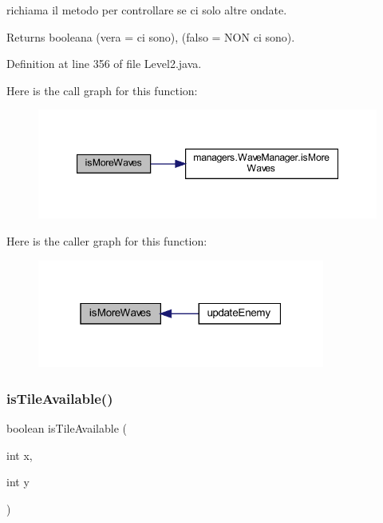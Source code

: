 richiama il metodo per controllare se ci solo altre ondate. 

\begin{DoxyReturn}{Returns}
booleana (vera = ci sono), (falso = N\+ON ci sono). 
\end{DoxyReturn}


Definition at line 356 of file Level2.\+java.

Here is the call graph for this function\+:\nopagebreak
\begin{figure}[H]
\begin{center}
\leavevmode
\includegraphics[width=347pt]{classscenes_1_1_level2_a999f12a033f49f299ad7f55bcae24447_cgraph}
\end{center}
\end{figure}
Here is the caller graph for this function\+:\nopagebreak
\begin{figure}[H]
\begin{center}
\leavevmode
\includegraphics[width=268pt]{classscenes_1_1_level2_a999f12a033f49f299ad7f55bcae24447_icgraph}
\end{center}
\end{figure}
\mbox{\label{classscenes_1_1_level2_aaeac2ee6b3a920a21928ee7b3dc8e7a9}} 
\subsubsection{\texorpdfstring{is\+Tile\+Available()}{isTileAvailable()}}
{\footnotesize\ttfamily boolean is\+Tile\+Available (\begin{DoxyParamCaption}\item[{int}]{x,  }\item[{int}]{y }\end{DoxyParamCaption})\hspace{0.3cm}{\ttfamily [private]}}



